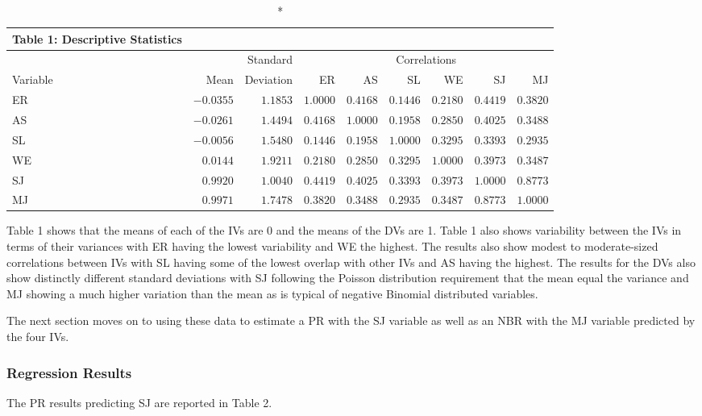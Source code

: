 \documentclass[ShortAfour,times,sageapa]{sagej}
\begin{document}
\begin{longtable}{lrr|rrrrrr}
	\caption*{
		{\large Table 1: Descriptive Statistics}
	} \\ 
	\toprule
	&  & Standard & \multicolumn{6}{c}{Correlations} \\ 
	\cmidrule(lr){4-9}
	Variable & Mean & Deviation & ER & AS & SL & WE & SJ & MJ \\ 
	\midrule
	ER & $-0.0355$ & $1.1853$ & $1.0000$ & $0.4168$ & $0.1446$ & $0.2180$ & $0.4419$ & $0.3820$ \\ 
	AS & $-0.0261$ & $1.4494$ & $0.4168$ & $1.0000$ & $0.1958$ & $0.2850$ & $0.4025$ & $0.3488$ \\ 
	SL & $-0.0056$ & $1.5480$ & $0.1446$ & $0.1958$ & $1.0000$ & $0.3295$ & $0.3393$ & $0.2935$ \\ 
	WE & $0.0144$ & $1.9211$ & $0.2180$ & $0.2850$ & $0.3295$ & $1.0000$ & $0.3973$ & $0.3487$ \\ 
	SJ & $0.9920$ & $1.0040$ & $0.4419$ & $0.4025$ & $0.3393$ & $0.3973$ & $1.0000$ & $0.8773$ \\ 
	MJ & $0.9971$ & $1.7478$ & $0.3820$ & $0.3488$ & $0.2935$ & $0.3487$ & $0.8773$ & $1.0000$ \\ 
	\bottomrule
\end{longtable}

	Table 1 shows that the means of each of the IVs are 0 and the means of the DVs are 1. 
	Table 1 also shows variability between the IVs in terms of their variances with ER having the lowest variability and WE the highest.
	The results also show modest to moderate-sized correlations between IVs with SL having some of the lowest overlap with other IVs and AS having the highest.
	The results for the DVs also show distinctly different standard deviations with SJ following the Poisson distribution requirement that the mean equal the variance and MJ showing a much higher variation than the mean as is typical of negative Binomial distributed variables.
	
	The next section moves on to using these data to estimate a PR with the SJ variable as well as an NBR with the MJ variable predicted by the four IVs.

		\subsubsection{Regression Results}
		
	The PR results predicting SJ are reported in Table 2. 
	
\end{document}
